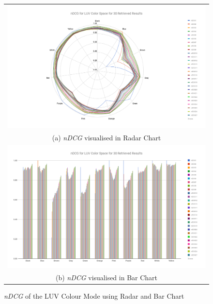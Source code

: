 \begin{figure}[htb!]
  \centering
\begin{tabular}{c}
 \includegraphics[width=0.9\linewidth]{image/retrievalTwo/radar_ndcg_luv.png}\\
 (a) \textit{nDCG} visualised in Radar Chart \\
  \includegraphics[width=0.9\linewidth]{image/retrievalTwo/bar_ndcg_luv.png}\\
 (b) \textit{nDCG} visualised in Bar Chart \\
\end{tabular}
\caption{\textit{nDCG} of the LUV Colour Mode using Radar and Bar Chart} \label{fig:colorndcg}
\end{figure}



